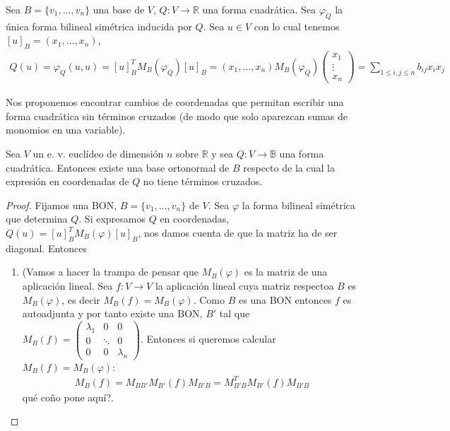 \documentclass[14pt]{book}
\begin{document}
\begin{dfn}
	Sea $B = \{v_1, \dots, v_n\}$ una base de $V$, $Q: V \to \mathbb{R}$ una forma cuadrática. Sea $\varphi_Q$ la única forma bilineal simétrica inducida por $Q$. Sea $u \in V$ con lo cual tenemos $[u]_B = (x_1, \dots, x_n)$,
	\begin{align*}
		Q(u) = \varphi_Q(u, u) = [u]_B^T M_B(\varphi_Q)[u]_B = (x_1, \dots, x_n)M_B(\varphi_Q)\left(\begin{array}{c}
		x_1 \\ \vdots \\ x_n
		\end{array}\right) = \sum_{1 \leq i, j \leq n} b_{ij} x_i x_j
	\end{align*}
\end{dfn}

Nos proponemos encontrar cambios de coordenadas que permitan escribir una forma cuadrática sin términos cruzados (de modo que solo aparezcan sumas de monomios en una variable).

\begin{tm}
	Sea $V$ un e. v. euclídeo de dimensión $n$ sobre $\mathbb{R}$ y sea $Q: V \to \mathbb{B}$ una forma cuadrática. Entonces existe una base ortonormal de $B$ respecto de la cual la expresión en coordenadas de $Q$ no tiene términos cruzados.
\end{tm}

\begin{proof}
	Fijamos una BON, $B = \{v_1, \dots, v_n\}$ de $V$. Sea $\varphi$ la forma bilineal simétrica que determina $Q$. Si expresamos $Q$ en coordenadas, $Q(u) = [u]_B^T M_B(\varphi)[u]_B$, nos damos cuenta de que la matriz ha de ser diagonal. Entonces
	\begin{enumerate}
		\item (Vamos a hacer la trampa de pensar que $M_B(\varphi)$ es la matriz de una aplicación lineal. Sea $f: V \to V$ la aplicación lineal cuya matriz respectoa $B$ es $M_B(\varphi)$, es decir $M_B(f) = M_B(\varphi)$. Como $B$ es una BON entonces $f$ es autoadjunta y por tanto existe una BON, $B'$ tal que $M_B(f) = \left(\begin{array}{ccc}
		\lambda_1 & 0 & 0 \\
		0 & \ddots & 0 \\
		0 & 0 & \lambda_n
		\end{array}\right)$. Entonces si queremos calcular $M_B(f) = M_B(\varphi)$:
		\begin{align*}
			M_B(f) = M_{BB'}M_{B'}(f)M_{B'B} = M_{B'B}^TM_{B'}(f)M_{B'B}
		\end{align*}
		qué coño pone aquí?.
	\end{enumerate}
\end{proof}
\end{document}
